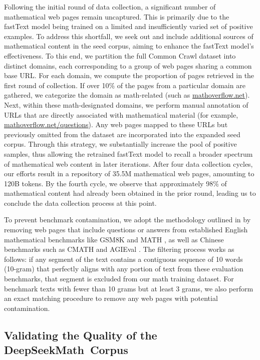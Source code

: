 Following the initial round of data collection, a significant number of mathematical web pages remain uncaptured. This is primarily due to the fastText model being trained on a limited and insufficiently varied set of positive examples. To address this shortfall, we seek out and include additional sources of mathematical content in the seed corpus, aiming to enhance the fastText model’s effectiveness. To this end, we partition the full Common Crawl dataset into distinct domains, each corresponding to a group of web pages sharing a common base URL. For each domain, we compute the proportion of pages retrieved in the first round of collection. If over 10\% of the pages from a particular domain are gathered, we categorize the domain as math-related (such as \url{mathoverflow.net}).
Next, within these math-designated domains, we perform manual annotation of URLs that are directly associated with mathematical material (for example, \url{mathoverflow.net/questions}). Any web pages mapped to these URLs but previously omitted from the dataset are incorporated into the expanded seed corpus. Through this strategy, we substantially increase the pool of positive samples, thus allowing the retrained fastText model to recall a broader spectrum of mathematical web content in later iterations. After four data collection cycles, our efforts result in a repository of 35.5M mathematical web pages, amounting to 120B tokens. By the fourth cycle, we observe that approximately 98\% of mathematical content had already been obtained in the prior round, leading us to conclude the data collection process at this point.

To prevent benchmark contamination, we adopt the methodology outlined in \cite{deepseek-coder} by removing web pages that include questions or answers from established English mathematical benchmarks like GSM8K \citep{gsm8k} and MATH \citep{MATH}, as well as Chinese benchmarks such as CMATH \citep{wei2023cmath} and AGIEval \citep{agieval}. The filtering process works as follows: if any segment of the text contains a contiguous sequence of 10 words (10-gram) that perfectly aligns with any portion of text from these evaluation benchmarks, that segment is excluded from our math training dataset. For benchmark texts with fewer than 10 grams but at least 3 grams, we also perform an exact matching procedure to remove any web pages with potential contamination.

\subsection{Validating the Quality of the DeepSeekMath~Corpus}

